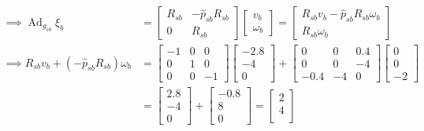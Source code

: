 \begin{align*}
    \implies
    \operatorname{Ad}_{g_{s b}} \xi_{b}
     & =
    \begin{bmatrix}
        R_{s b} & - \widehat{p}_{s b} R_{s b} \\
        0       & R_{s b}
    \end{bmatrix}
    \begin{bmatrix}
        v_b \\
        \omega_b
    \end{bmatrix}
    =
    \begin{bmatrix}
        R_{s b} v_b - \widehat{p}_{s b} R_{s b} \omega_b \\
        R_{s b} \omega_b
    \end{bmatrix}
    \\ \implies
    R_{s b} v_b + (- \widehat{p}_{s b} R_{s b}) \omega_b
     & =
    \begin{bmatrix}
        -1 & 0 & 0  \\
        0  & 1 & 0  \\
        0  & 0 & -1
    \end{bmatrix}
    \begin{bmatrix}
        -2.8 \\
        -4   \\
        0
    \end{bmatrix}
    +
    \begin{bmatrix}
        0    & 0  & 0.4 \\
        0    & 0  & -4  \\
        -0.4 & -4 & 0
    \end{bmatrix}
    \begin{bmatrix}
        0 \\
        0 \\
        -2
    \end{bmatrix}
    \\ & =
    \begin{bmatrix}
        2.8 \\
        -4  \\
        0
    \end{bmatrix}
    +
    \begin{bmatrix}
        -0.8 \\
        8    \\
        0
    \end{bmatrix}
    =
    \begin{bmatrix}
        2 \\
        4 \\

\end{bmatrix}
\end{align*}
